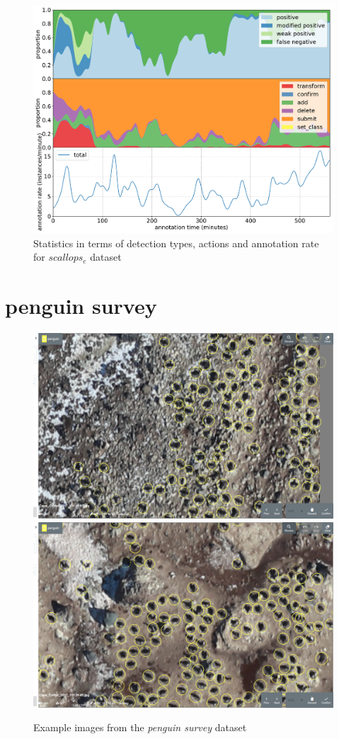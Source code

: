 \begin{figure}[!h]
\centering
\includegraphics[width=1.0\linewidth]{charts/action_annotations/scallops.pdf}
\caption{Statistics in terms of detection types, actions and annotation rate for $scallops_e$ dataset}
\label{fig:scallop_annotation}
\end{figure}

\pagebreak
\section {penguin survey}
\label{sec:penguin_survey_details}


\begin{figure}[!h]
\centering
  \includegraphics[width=0.475\linewidth]{figures/annotation/screenshots/penguins_aerial.png}
  \hfill
  \includegraphics[width=0.475\linewidth]{figures/annotation/screenshots/penguins_aerial2.png}
  \caption{}
\caption{ Example images from the \emph{penguin survey} dataset}
\label {fig:penguin_aerial_examples}
\end{figure}

